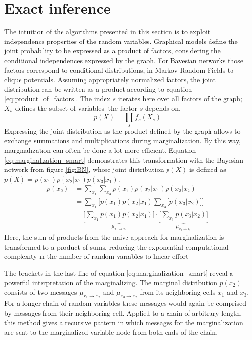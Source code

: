 \documentclass{sigkdd}
\begin{document}
\section{Exact inference}\label{chapter:exact_inference}
The intuition of the algorithms presented in this section is to exploit independence properties of the random variables. Graphical models define the joint probability to be expressed as a product of factors, considering the conditional independences expressed by the graph. For Bayesian networks those factors correspond to conditional distributions, in Markov Random Fields to clique potentials. Assuming appropriately normalized factors, the joint distribution can be written as a product according to equation \ref{eq:product_of_factors}. The index $s$ iterates here over all factors of the graph; $X_s$ defines the subset of variables, the factor $s$ depends on.
\begin{equation}\label{eq:product_of_factors}
p(X)= \prod_{s} f_s(X_s)
\end{equation}
Expressing the joint distribution as the product defined by the graph allows to exchange summations and multiplications during marginalization. By this way, marginalization can often be done a lot more efficient. Equation \ref{eq:marginalization_smart} demonstrates this transformation with the Bayesian network from figure \ref{fig:BN}, whose joint distribution $p(X)$ is defined as $p(X) =  p(x_1) p(x_2|x_1) p(x_3|x_1)$.
\begin{equation}\label{eq:marginalization_smart}
\begin{split}
p(x_2) &= \sum_{x_1} \sum_{x_3} p(x_1) p(x_2|x_1) p(x_3|x_2) \\ &= \sum_{x_1} \Big[  p(x_1) p(x_2|x_1) \sum_{x_3} \Big[ p(x_3|x_2)\Big] \Big] \\ &= \underbrace{\Big[ \sum_{x_1}  p(x_1) p(x_2|x_1)\Big]}_{\mu_{x_1 \rightarrow x_2}}\cdot \underbrace{\Big[ \sum_{x_3}  p(x_3|x_2)\Big]}_{\mu_{x_3 \rightarrow x_2}}
\end{split}
\end{equation}
Here, the sum of products from the naive approach for marginalization is transformed to a product of sums, reducing the exponential computational complexity in the number of random variables to linear effort.

The brackets in the last line of equation \ref{eq:marginalization_smart} reveal a powerful interpretation of the marginalizing. The marginal distribution $p(x_2)$ consists of two messages $\mu_{x_1 \rightarrow x_2}$ and $\mu_{x_3 \rightarrow x_2}$ from its neighboring cells $x_1$ and $x_3$. For a longer chain of random variables these messages would again be comprised by messages from their neighboring cell. Applied to a chain of arbitrary length, this method gives a recursive pattern in which messages for the marginalization are sent to the marginalized variable node from both ends of the chain.  
\end{document}

